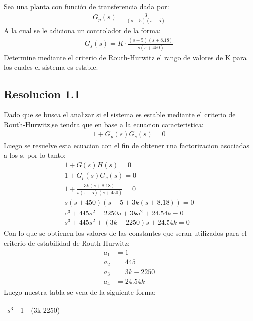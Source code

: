 \documentclass[
  11pt,
  letterpaper,
   addpoints,
   answers
  ]{exam}
\begin{document}
\begin{questions}
    \question Sea una planta con función de transferencia dada por:
    \begin{align}
        G_{p}(s) = \frac{3}{(s+5)(s-5)}
    \end{align}
    A la cual se le adiciona un controlador de la forma:
    \begin{align}
        G_{s}(s) = K \cdot \frac{(s+5)(s+8.18)}{s(s+450)} 
    \end{align}
    Determine mediante el criterio de Routh-Hurwitz el rango de valores de K para los cuales el sistema es estable.
    \begin{solution}
        \subsection*{Resolucion 1.1}
    Dado que se busca el analizar si el sistema es estable mediante el criterio de Routh-Hurwitz,se tendra que en base a la ecuacion caracteristica:
    \begin{align}
        1 + G_{p}(s)G_{s}(s) = 0
    \end{align}
    Luego se resuelve esta ecuacion con el fin de obtener una factorizacion asociadas a los s, por lo tanto:
    \begin{align}
        1+G(s)H(s) = 0\\
        1+G_{p}(s)G_{c}(s) = 0\\
        1+\frac{3k(s+8.18)}{s(s-5)(s+450)} = 0\\
        s(s+450)(s-5 + 3k(s+8.18)) = 0\\
        s^{3} + 445s^{2} - 2250s + 3ks^{2} + 24.54k = 0\\
        s^{3} + 445s^{2} + (3k-2250)s + 24.54k = 0
    \end{align}
    Con lo que se obtienen los valores de las constantes que seran utilizados para el criterio de estabilidad de Routh-Hurwitz:
    \begin{align}
        a_{1} &= 1\\
        a_{2} &= 445\\
        a_{3} &= 3k-2250\\
        a_{4} &= 24.54k
    \end{align}
    Luego nuestra tabla se vera de la siguiente forma:
    \begin{center}
        \begin{tabular}{|c|c|c|}
            \hline
            $s^{3}$ & 1 & (3k-2250)\\

\end{tabular}
\end{center}
\end{solution}
\end{questions}
\end{document}
